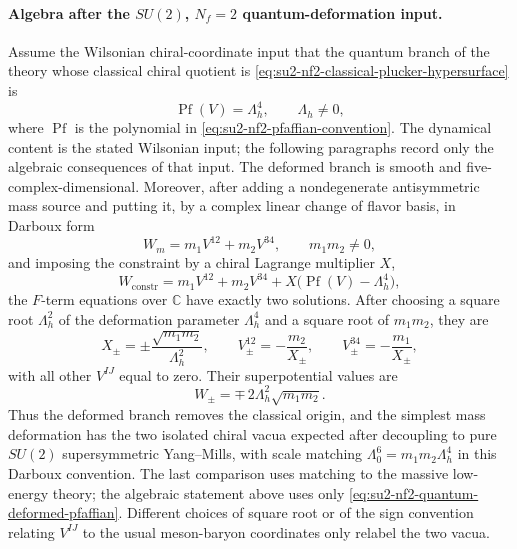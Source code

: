 \paragraph{Algebra after the \(SU(2)\), \(N_f=2\) quantum-deformation input.}
Assume the Wilsonian chiral-coordinate input that the quantum branch of the
theory whose classical chiral quotient is
\eqref{eq:su2-nf2-classical-plucker-hypersurface} is
\begin{equation}
  \operatorname{Pf}(V)=\Lambda_h^4,
  \qquad \Lambda_h\neq0,
  \label{eq:su2-nf2-quantum-deformed-pfaffian}
\end{equation}
where \(\operatorname{Pf}\) is the polynomial in
\eqref{eq:su2-nf2-pfaffian-convention}.  The dynamical content is the stated
Wilsonian input; the following paragraphs record only the algebraic
consequences of that input.  The deformed branch is
smooth and five-complex-dimensional.  Moreover, after adding a nondegenerate
antisymmetric mass source and putting it, by a complex linear change of
flavor basis, in Darboux form
\begin{equation}
  W_m=m_1V^{12}+m_2V^{34},
  \qquad m_1m_2\neq0,
  \label{eq:su2-nf2-diagonal-mass-source}
\end{equation}
and imposing the constraint by a chiral Lagrange multiplier \(X\),
\begin{equation}
  W_{\mathrm{constr}}
  =
  m_1V^{12}+m_2V^{34}
  +X\bigl(\operatorname{Pf}(V)-\Lambda_h^4\bigr),
  \label{eq:su2-nf2-constrained-mass-superpotential}
\end{equation}
the \(F\)-term equations over \(\mathbb C\) have exactly two solutions.
After choosing a square root \(\Lambda_h^2\) of the deformation parameter
\(\Lambda_h^4\) and a square root of \(m_1m_2\), they are
\begin{equation}
  X_\pm=\pm\frac{\sqrt{m_1m_2}}{\Lambda_h^2},
  \qquad
  V^{12}_\pm=-\frac{m_2}{X_\pm},
  \qquad
  V^{34}_\pm=-\frac{m_1}{X_\pm},
  \label{eq:su2-nf2-massive-vacua}
\end{equation}
with all other \(V^{IJ}\) equal to zero.  Their superpotential values are
\begin{equation}
  W_\pm
  =
  \mp\,2\Lambda_h^2\sqrt{m_1m_2}.
  \label{eq:su2-nf2-massive-superpotential-values}
\end{equation}
Thus the deformed branch removes the classical origin, and the simplest
mass deformation has the two isolated chiral vacua expected after decoupling
to pure \(SU(2)\) supersymmetric Yang--Mills, with scale matching
\(\Lambda_0^6=m_1m_2\Lambda_h^4\) in this Darboux convention.  The last
comparison uses matching to the massive low-energy theory; the algebraic
statement above uses only
\eqref{eq:su2-nf2-quantum-deformed-pfaffian}.  Different choices of square
root or of the sign convention relating \(V^{IJ}\) to the usual meson-baryon
coordinates only relabel the two vacua.

